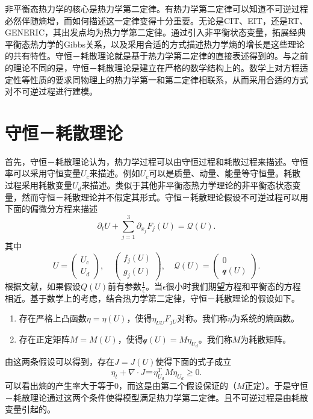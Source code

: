 \documentclass{article}
\begin{document}
 	非平衡态热力学的核心是热力学第二定律。有热力学第二定律可以知道不可逆过程必然伴随熵增，而如何描述这一定律变得十分重要。无论是CIT、EIT，还是RT、GENERIC，其出发点均为热力学第二定律。通过引入非平衡状态变量，拓展经典平衡态热力学的Gibbs关系，以及采用合适的方式描述热力学熵的增长是这些理论的共有特性。守恒－耗散理论就是基于热力学第二定律的直接表述得到的。与之前的理论不同的是，守恒－耗散理论是建立在严格的数学结构上的。数学上对方程适定性等性质的要求同物理上的热力学第一和第二定律相联系，从而采用合适的方式对不可逆过程进行建模\cite{}。
	
	\section{守恒－耗散理论}
	首先，守恒－耗散理论认为，热力学过程可以由守恒过程和耗散过程来描述。守恒率可以采用守恒变量$U_c$来描述。例如$U_c$可以是质量、动量、能量等守恒量。耗散过程采用耗散变量$U_d$来描述。类似于其他非平衡态热力学理论的非平衡态状态变量，然而守恒－耗散理论并不假定其形式。守恒－耗散理论假设不可逆过程可以用下面的偏微分方程来描述
	\begin{equation}\label{eq:CDF}
		\partial_t U + \sum_{j=1}^3 \partial_{x_j} F_j(U) = \mathcal{Q} (U) .
	\end{equation}
	其中
	\begin{equation*}
		U = \left( \begin{array}{c}
			U_c \\ U_d 
			\end{array} \right) , \quad
			 \left( \begin{array}{c}
			f_j(U) \\ g_j(U)
			\end{array} \right), \quad 
			\mathcal{Q}(U) = \left( \begin{array}{c}
			0 \\ \mathcal{q} (U) 
			\end{array} \right).
	\end{equation*}
	根据文献\cite{}，如果假设$Q(U)$前有参数$\frac{1}{\epsilon}$。当$\epsilon$很小时我们期望方程和平衡态的方程相近。基于数学上的考虑\cite{}，结合热力学第二定律，守恒－耗散理论的假设如下\cite{}。
	\begin{enumerate}
		\item 存在严格上凸函数$\eta = \eta (U)$，使得$\eta_{UU} F_{jU}$对称。我们称$\eta$为系统的熵函数。
		\item 存在正定矩阵$M = M(U)$，使得$\mathcal{q}(U) = M \eta_{U_d}$。我们称$M$为耗散矩阵。
	\end{enumerate}
	由这两条假设可以得到，存在$J = J(U)$使得下面的式子成立
	\begin{equation*}
		\eta_t + \nabla \cdot J ＝ \eta_{U_d}^T M \eta_{U_d} \ge 0.
	\end{equation*}
	可以看出熵的产生率大于等于0，而这是由第二个假设保证的（$M$正定）。于是守恒－耗散理论通过这两个条件使得模型满足热力学第二定律。且不可逆过程是由耗散变量引起的\cite{}。
	
\end{document}
